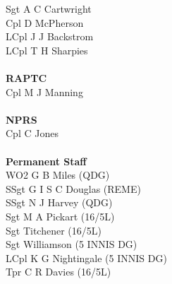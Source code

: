 \begin{multicols}{2}
  Sgt A C Cartwright \\
  Cpl D McPherson \\
  LCpl J J Backstrom \\
  LCpl T H Sharpies \\
  \\
  \textbf{RAPTC} \\
  Cpl M J Manning \\
  \\
  \textbf{NPRS} \\
  Cpl C Jones \\
  \\
  \textbf{Permanent Staff} \\
  WO2 G B Miles (QDG) \\
  SSgt G I S C Douglas (REME) \\
  SSgt N J Harvey (QDG) \\
  Sgt M A Pickart (16/5L) \\
  Sgt Titchener (16/5L) \\
  Sgt Williamson (5 INNIS DG) \\
  LCpl K G Nightingale (5 INNIS DG) \\
  Tpr C R Davies (16/5L) \\
\end{multicols}
